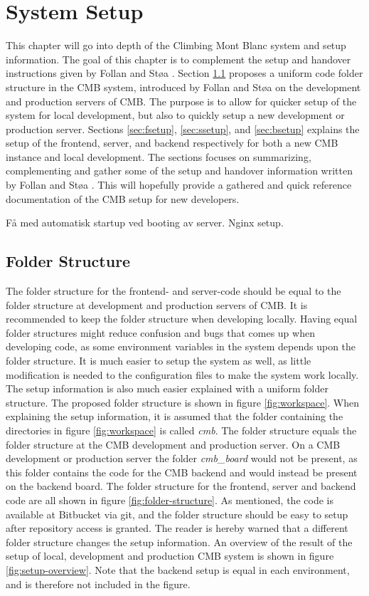 \chapter{System Setup}
\label{apdx:setup}
This chapter will go into depth of the Climbing Mont Blanc system and setup information. The goal of this chapter is to complement the setup and handover instructions given by Follan and Støa \cite{mt:T&S}. Section \ref{sec:folder} proposes a uniform code folder structure in the CMB system, introduced by Follan and Støa on the development and production servers of CMB. The purpose is to allow for quicker setup of the system for local development, but also to quickly setup a new development or production server. Sections \ref{sec:fsetup}, \ref{sec:ssetup}, and \ref{sec:bsetup} explains the setup of the frontend, server, and backend respectively for both a new CMB instance and local development. The sections focuses on summarizing, complementing and gather some of the setup and handover information written by Follan and Støa \cite{mt:T&S}. This will hopefully provide a gathered and quick reference documentation of the CMB setup for new developers.

Få med automatisk startup ved booting av server.
Nginx setup.

\section{Folder Structure}
\label{sec:folder}
The folder structure for the frontend- and server-code should be equal to the folder structure at development and production servers of CMB. It is recommended to keep the folder structure when developing locally. Having equal folder structures might reduce confusion and bugs that comes up when developing code, as some environment variables in the system depends upon the folder structure. It is much easier to setup the system as well, as little modification is needed to the configuration files to make the system work locally. The setup information is also much easier explained with a uniform folder structure. The proposed folder structure is shown in figure \ref{fig:workspace}. When explaining the setup information, it is assumed that the folder containing the directories in figure \ref{fig:workspace} is called \textit{cmb}. The folder structure equals the folder structure at the CMB development and production server. On a CMB development or production server the folder \textit{cmb\_board} would not be present, as this folder contains the code for the CMB backend and would instead be present on the backend board. The folder structure for the frontend, server and backend code are all shown in figure \ref{fig:folder-structure}. As mentioned, the code is available at Bitbucket via git, and the folder structure should be easy to setup after repository access is granted. The reader is hereby warned that a different folder structure changes the setup information. An overview of the result of the setup of local, development and production CMB system is shown in figure \ref{fig:setup-overview}. Note that the backend setup is equal in each environment, and is therefore not included in the figure.

